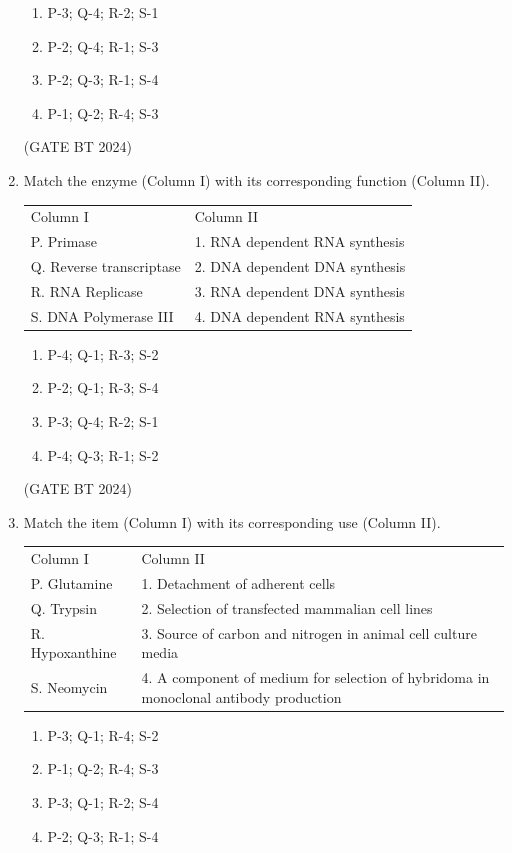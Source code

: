\documentclass[journal,12pt,onecolumn]{IEEEtran}
\theoremstyle{remark}
\begin{document}
\begin{enumerate}
\begin{enumerate}
    \item  P-3; Q-4; R-2; S-1 
    \item  P-2; Q-4; R-1; S-3 
    \item  P-2; Q-3; R-1; S-4 
    \item  P-1; Q-2; R-4; S-3
\end{enumerate}
\hfill (GATE BT 2024)

\item Match the enzyme (Column I) with its corresponding function (Column II).

\begin{tabular}{ll}
Column I & Column II \\
P. Primase & 1. RNA dependent RNA synthesis \\
Q. Reverse transcriptase & 2. DNA dependent DNA synthesis \\
R. RNA Replicase & 3. RNA dependent DNA synthesis \\
S. DNA Polymerase III & 4. DNA dependent RNA synthesis \\
\end{tabular}

\begin{enumerate}
   \item P-4; Q-1; R-3; S-2 
   \item P-2; Q-1; R-3; S-4 
   \item P-3; Q-4; R-2; S-1 
   \item P-4; Q-3; R-1; S-2
\end{enumerate}

\hfill (GATE BT 2024)

\item Match the item (Column I) with its corresponding use (Column II).

\begin{tabular}{ll}
Column I & Column II \\
P. Glutamine & 1. Detachment of adherent cells \\
Q. Trypsin & 2. Selection of transfected mammalian cell lines \\
R. Hypoxanthine & 3. Source of carbon and nitrogen in animal cell culture media \\
S. Neomycin & 4. A component of medium for selection of hybridoma in monoclonal antibody production \\
\end{tabular}

\begin{enumerate}
   \item P-3; Q-1; R-4; S-2 
   \item P-1; Q-2; R-4; S-3 
   \item P-3; Q-1; R-2; S-4 
   \item P-2; Q-3; R-1; S-4
\end{enumerate}


\end{enumerate}
\end{document}
